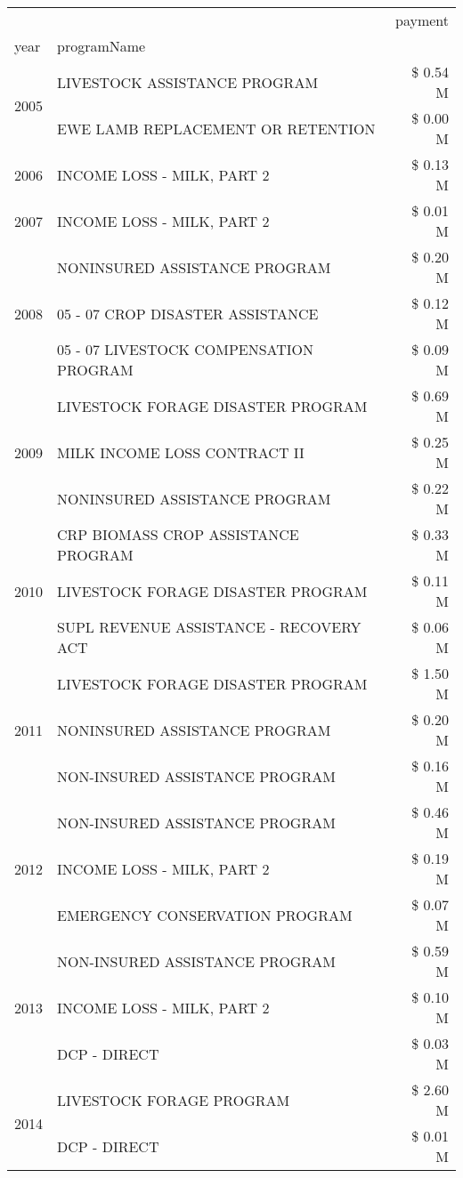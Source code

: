 \begin{tabular}{llr}
\toprule
 &  & payment \\
year & programName &  \\
\midrule
\multirow[t]{2}{*}{2005} & LIVESTOCK ASSISTANCE PROGRAM & \$ 0.54 M \\
 & EWE LAMB REPLACEMENT OR RETENTION & \$ 0.00 M \\
\cline{1-3}
2006 & INCOME LOSS - MILK, PART 2 & \$ 0.13 M \\
\cline{1-3}
2007 & INCOME LOSS - MILK, PART 2 & \$ 0.01 M \\
\cline{1-3}
\multirow[t]{3}{*}{2008} & NONINSURED ASSISTANCE PROGRAM & \$ 0.20 M \\
 & 05 - 07 CROP DISASTER ASSISTANCE & \$ 0.12 M \\
 & 05 - 07 LIVESTOCK COMPENSATION PROGRAM & \$ 0.09 M \\
\cline{1-3}
\multirow[t]{3}{*}{2009} & LIVESTOCK FORAGE DISASTER  PROGRAM & \$ 0.69 M \\
 & MILK INCOME LOSS CONTRACT II & \$ 0.25 M \\
 & NONINSURED ASSISTANCE PROGRAM & \$ 0.22 M \\
\cline{1-3}
\multirow[t]{3}{*}{2010} & CRP BIOMASS CROP ASSISTANCE PROGRAM & \$ 0.33 M \\
 & LIVESTOCK FORAGE DISASTER PROGRAM & \$ 0.11 M \\
 & SUPL REVENUE ASSISTANCE - RECOVERY ACT & \$ 0.06 M \\
\cline{1-3}
\multirow[t]{3}{*}{2011} & LIVESTOCK FORAGE DISASTER PROGRAM & \$ 1.50 M \\
 & NONINSURED ASSISTANCE PROGRAM & \$ 0.20 M \\
 & NON-INSURED ASSISTANCE PROGRAM & \$ 0.16 M \\
\cline{1-3}
\multirow[t]{3}{*}{2012} & NON-INSURED ASSISTANCE PROGRAM & \$ 0.46 M \\
 & INCOME LOSS - MILK, PART 2 & \$ 0.19 M \\
 & EMERGENCY CONSERVATION PROGRAM & \$ 0.07 M \\
\cline{1-3}
\multirow[t]{3}{*}{2013} & NON-INSURED ASSISTANCE PROGRAM & \$ 0.59 M \\
 & INCOME LOSS - MILK, PART 2 & \$ 0.10 M \\
 & DCP - DIRECT & \$ 0.03 M \\
\cline{1-3}
\multirow[t]{3}{*}{2014} & LIVESTOCK FORAGE PROGRAM & \$ 2.60 M \\
 & DCP - DIRECT & \$ 0.01 M \\

\end{tabular}
